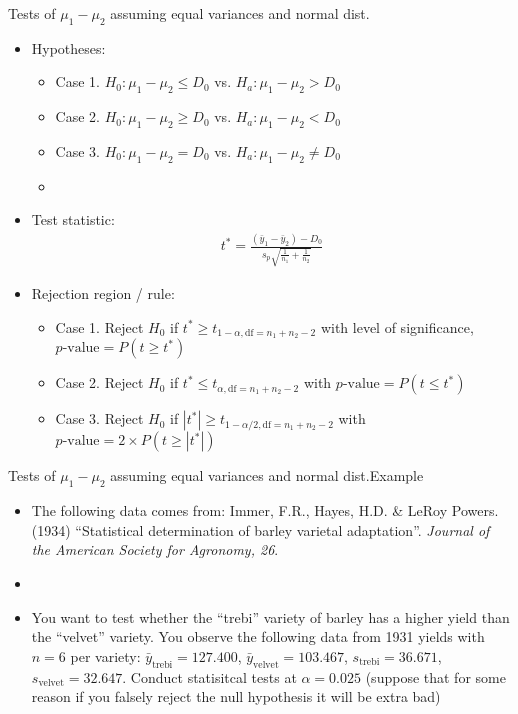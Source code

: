 \documentclass[xcolor=dvipsnames]{beamer}
\begin{document}
\begin{frame}{Tests of $\mu_1 - \mu_2$ assuming equal variances and normal dist.}
\begin{itemize}
	\item Hypotheses:
	\begin{itemize}
		\item Case 1. $H_0: \mu_1 - \mu_2 \leq D_0$ vs. $H_a: \mu_1 - \mu_2 > D_0$
		\item Case 2. $H_0: \mu_1 - \mu_2 \geq D_0$ vs. $H_a: \mu_1 - \mu_2 < D_0$
		\item Case 3. $H_0: \mu_1 - \mu_2 = D_0$ vs. $H_a: \mu_1 - \mu_2 \neq D_0$
		\item[]
	\end{itemize}
	
	\item Test statistic:
	\begin{align*}
	t^* = \frac{(\bar{y}_1-\bar{y}_2) - D_0}{s_p \sqrt{\frac{1}{n_1} + \frac{1}{n_2}}}
	\end{align*}
	
	\item Rejection region / rule:
	\begin{itemize}
		\item Case 1. Reject $H_0$ if $t^* \geq t_{1-\alpha, \text{df} = n_1 + n_2 -2}$ with level of significance, $p\text{-value}=P(t \geq t^*)$
		\item Case 2. Reject $H_0$ if $t^* \leq t_{\alpha, \text{df} = n_1 + n_2 -2}$ with $p\text{-value}=P(t \leq t^*)$
		\item Case 3. Reject $H_0$ if $|t^*| \geq t_{1-\alpha / 2, \text{df} = n_1 + n_2 -2}$ with $p\text{-value}=2 \times P(t \geq |t^*|)$
	\end{itemize}
\end{itemize}
\end{frame}

\begin{frame}{Tests of $\mu_1 - \mu_2$ assuming equal variances and normal dist.}{Example}
\begin{itemize}
	\item The following data comes from: Immer, F.R., Hayes, H.D. \& LeRoy Powers. (1934) ``Statistical determination of barley varietal adaptation''. \emph{Journal of the American Society for Agronomy, 26}.
	\item[]
	\item You want to test whether the ``trebi'' variety of barley has a higher yield than the ``velvet'' variety. You observe the following data from 1931 yields with $n=6$ per variety: $\bar{y}_{\text{trebi}} = 127.400$, $\bar{y}_{\text{velvet}} = 103.467$, $s_{\text{trebi}} = 36.671$, $s_{\text{velvet}} = 32.647$. Conduct statisitcal tests at $\alpha = 0.025$ (suppose that for some reason if you falsely reject the null hypothesis it will be extra bad)
\end{itemize}
\end{frame}
\end{document}
